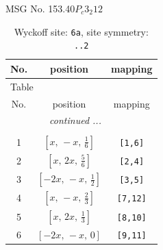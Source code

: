 \documentclass[fleqn,8pt]{jsarticle}
\begin{document}
\setcounter{MaxMatrixCols}{32}

\renewcommand{\tablename}{Table~}
\renewcommand{\figurename}{Figure~}
\begin{center}
\LARGE
MSG No. 153.40\quad$P_{c}3_{2}12$
\end{center}
\renewcommand{\arraystretch}{1.2}
\begin{longtable}{ccc}
\caption{Wyckoff site: {\tt 6a}, site symmetry: {\tt ..2}}
 \\
 \hline \hline
No. & position & mapping \\ \hline \endfirsthead

\multicolumn{2}{l}{\tablename\ \thetable{}} \\
 \hline \hline
No. & position & mapping \\ \hline \endhead

 \hline \hline
\multicolumn{2}{r}{\footnotesize\it continued ...} \\ \endfoot

 \hline \hline
\multicolumn{2}{r}{} \\ \endlastfoot

1 & $\left[ x,\, - x,\, \frac{1}{6} \right]$ & {\tt [1,6]} \\ \hline
2 & $\left[ x,\, 2 x,\, \frac{5}{6} \right]$ & {\tt [2,4]} \\ \hline
3 & $\left[ - 2 x,\, - x,\, \frac{1}{2} \right]$ & {\tt [3,5]} \\ \hline
4 & $\left[ x,\, - x,\, \frac{2}{3} \right]$ & {\tt [7,12]} \\ \hline
5 & $\left[ x,\, 2 x,\, \frac{1}{3} \right]$ & {\tt [8,10]} \\ \hline
6 & $\left[ - 2 x,\, - x,\, 0 \right]$ & {\tt [9,11]} \\
\end{longtable}
\renewcommand{\arraystretch}{1.2}
\end{document}
